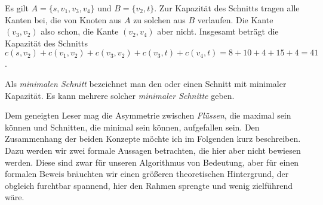 \vspace{-8pt}
\begin{center}
\end{center}
\vspace{-8pt}

Es gilt $A = \{s, v_1, v_3, v_4\}$ und $B = \{v_2, t\}$. Zur Kapazität des Schnitts tragen alle Kanten bei, die von Knoten aus $A$ zu solchen aus $B$ verlaufen. Die Kante $(v_3,v_2)$ also schon, die Kante $(v_2, v_4)$ aber nicht. Insgesamt beträgt die Kapazität des Schnitts $c(s,v_2) + c(v_1, v_2) + c(v_3,v_2) + c(v_3,t) + c(v_4,t) = 8 + 10 + 4 + 15 + 4 = 41$.  

\begin{definition}
	Als \emph{minimalen Schnitt} bezeichnet man den oder einen Schnitt mit minimaler Kapazität. Es kann mehrere solcher \emph{minimaler Schnitte} geben. 
\end{definition}

Dem geneigten Leser mag die Asymmetrie zwischen \emph{Flüssen}, die maximal sein können und Schnitten, die minimal sein können, aufgefallen sein. Den Zusammenhang der beiden Konzepte möchte ich im Folgenden kurz beschreiben. Dazu werden wir zwei formale Aussagen betrachten, die hier aber nicht bewiesen werden. Diese sind zwar für unseren Algorithmus von Bedeutung, aber für einen formalen Beweis bräuchten wir einen größeren theoretischen Hintergrund, der obgleich furchtbar spannend, hier den Rahmen sprengte und wenig zielführend wäre.

